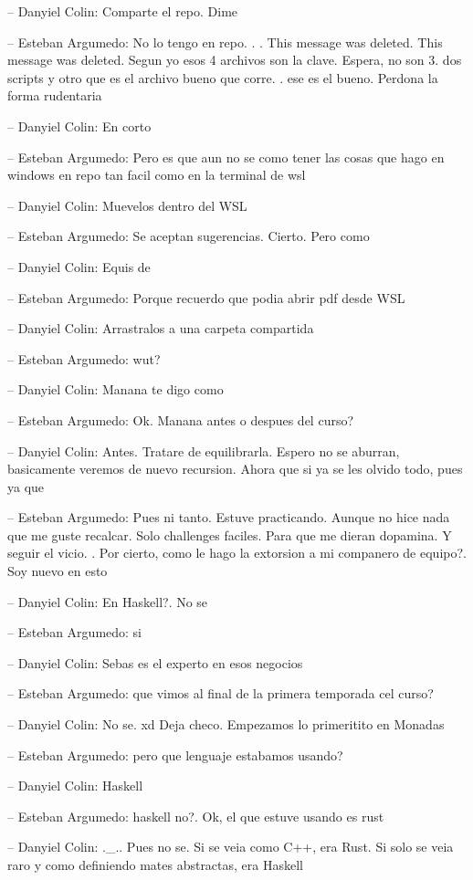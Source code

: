 -- Danyiel Colin: Comparte el repo. Dime

-- Esteban Argumedo: No lo tengo en repo. . . This message was deleted.
This message was deleted. Segun yo esos 4 archivos son la clave. Espera,
no son 3. dos scripts y otro que es el archivo bueno que corre. . ese es
el bueno. Perdona la forma rudentaria

-- Danyiel Colin: En corto

-- Esteban Argumedo: Pero es que aun no se como tener las cosas que hago
en windows en repo tan facil como en la terminal de wsl

-- Danyiel Colin: Muevelos dentro del WSL

-- Esteban Argumedo: Se aceptan sugerencias. Cierto. Pero como

-- Danyiel Colin: Equis de

-- Esteban Argumedo: Porque recuerdo que podia abrir pdf desde WSL

-- Danyiel Colin: Arrastralos a una carpeta compartida

-- Esteban Argumedo: wut?

-- Danyiel Colin: Manana te digo como

-- Esteban Argumedo: Ok. Manana antes o despues del curso?

-- Danyiel Colin: Antes. Tratare de equilibrarla. Espero no se aburran,
basicamente veremos de nuevo recursion. Ahora que si ya se les olvido
todo, pues ya que

-- Esteban Argumedo: Pues ni tanto. Estuve practicando. Aunque no hice
nada que me guste recalcar. Solo challenges faciles. Para que me dieran
dopamina. Y seguir el vicio. . Por cierto, como le hago la extorsion a
mi companero de equipo?. Soy nuevo en esto

-- Danyiel Colin: En Haskell?. No se

-- Esteban Argumedo: si

-- Danyiel Colin: Sebas es el experto en esos negocios

-- Esteban Argumedo: que vimos al final de la primera temporada cel
curso?

-- Danyiel Colin: No se. xd Deja checo. Empezamos lo primeritito en
Monadas

-- Esteban Argumedo: pero que lenguaje estabamos usando?

-- Danyiel Colin: Haskell

-- Esteban Argumedo: haskell no?. Ok, el que estuve usando es rust

-- Danyiel Colin: .\_.. Pues no se. Si se veia como C++, era Rust. Si
solo se veia raro y como definiendo mates abstractas, era Haskell

